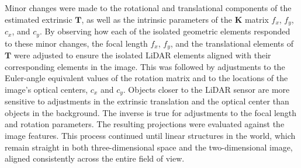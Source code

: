 \documentclass{erauthesis}
\begin{document}
Minor changes were made to the rotational and translational components of the estimated extrinsic $\mathbf{T}$, as well as the intrinsic parameters of the $\mathbf{K}$ matrix $f_x$, $f_y$, $c_x$, and $c_y$.
By observing how each of the isolated geometric elements responded to these minor changes, the focal length $f_x$, $f_y$, and the translational elements of $\mathbf{T}$ were adjusted to ensure the isolated LiDAR elements aligned with their corresponding elements in the image. 
This was followed by adjustments to the Euler-angle equivalent values of the rotation matrix and to the locations of the image's optical centers, $c_x$ and $c_y$.
Objects closer to the LiDAR sensor are more sensitive to adjustments in the extrinsic translation and the optical center than objects in the background.
The inverse is true for adjustments to the focal length and rotation parameters.
The resulting projections were evaluated against the image features. 
This process continued until linear structures in the world, which remain straight in both three-dimensional space and the two-dimensional image, aligned consistently across the entire field of view. 






\end{document}
